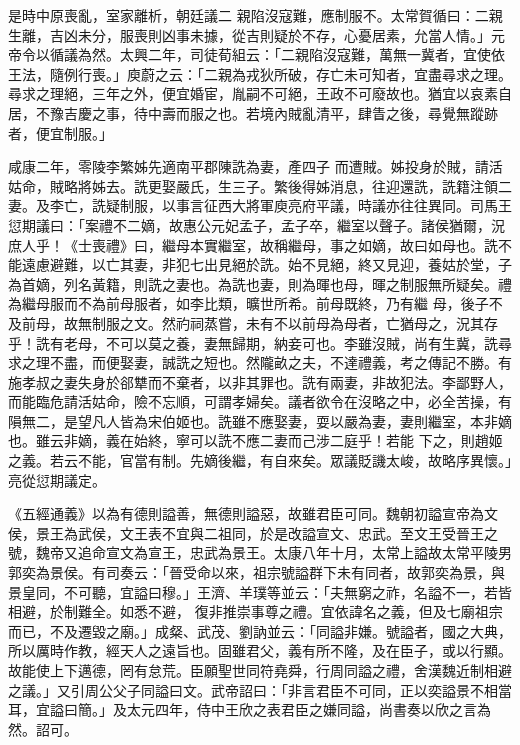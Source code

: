\begin{pinyinscope}
 是時中原喪亂，室家離析，朝廷議二
 親陷沒寇難，應制服不。太常賀循曰：二親生離，吉凶未分，服喪則凶事未據，從吉則疑於不存，心憂居素，允當人情。」元帝令以循議為然。太興二年，司徒荀組云：「二親陷沒寇難，萬無一冀者，宜使依王法，隨例行喪。」庾蔚之云：「二親為戎狄所破，存亡未可知者，宜盡尋求之理。尋求之理絕，三年之外，便宜婚宦，胤嗣不可絕，王政不可廢故也。猶宜以哀素自居，不豫吉慶之事，待中壽而服之也。若境內賊亂清平，肆眚之後，尋覺無蹤跡者，便宜制服。」



 咸康二年，零陵李繁姊先適南平郡陳詵為妻，產四子
 而遭賊。姊投身於賊，請活姑命，賊略將姊去。詵更娶嚴氏，生三子。繁後得姊消息，往迎還詵，詵籍注領二妻。及李亡，詵疑制服，以事言征西大將軍庾亮府平議，時議亦往往異同。司馬王愆期議曰：「案禮不二嫡，故惠公元妃孟子，孟子卒，繼室以聲子。諸侯猶爾，況庶人乎！《士喪禮》曰，繼母本實繼室，故稱繼母，事之如嫡，故曰如母也。詵不能遠慮避難，以亡其妻，非犯七出見絕於詵。始不見絕，終又見迎，養姑於堂，子為首嫡，列名黃籍，則詵之妻也。為詵也妻，則為暉也母，暉之制服無所疑矣。禮為繼母服而不為前母服者，如李比類，曠世所希。前母既終，乃有繼
 母，後子不及前母，故無制服之文。然礿祠蒸嘗，未有不以前母為母者，亡猶母之，況其存乎！詵有老母，不可以莫之養，妻無歸期，納妾可也。李雖沒賊，尚有生冀，詵尋求之理不盡，而便娶妻，誠詵之短也。然隴畝之夫，不達禮義，考之傳記不勝。有施孝叔之妻失身於郤犨而不棄者，以非其罪也。詵有兩妻，非故犯法。李鄙野人，而能臨危請活姑命，險不忘順，可謂孝婦矣。議者欲令在沒略之中，必全苦操，有隕無二，是望凡人皆為宋伯姬也。詵雖不應娶妻，耍以嚴為妻，妻則繼室，本非嫡也。雖云非嫡，義在始終，寧可以詵不應二妻而己涉二庭乎！若能
 下之，則趙姬之義。若云不能，官當有制。先嫡後繼，有自來矣。眾議貶譏太峻，故略序異懷。」亮從愆期議定。



 《五經通義》以為有德則謚善，無德則謚惡，故雖君臣可同。魏朝初謚宣帝為文侯，景王為武侯，文王表不宜與二祖同，於是改謚宣文、忠武。至文王受晉王之號，魏帝又追命宣文為宣王，忠武為景王。太康八年十月，太常上謚故太常平陵男郭奕為景侯。有司奏云：「晉受命以來，祖宗號謚群下未有同者，故郭奕為景，與景皇同，不可聽，宜謚曰穆。」王濟、羊璞等並云：「夫無窮之祚，名謚不一，若皆相避，於制難全。如悉不避，
 復非推崇事尊之禮。宜依諱名之義，但及七廟祖宗而已，不及遷毀之廟。」成粲、武茂、劉訥並云：「同謚非嫌。號謚者，國之大典，所以厲時作教，經天人之遠旨也。固雖君父，義有所不隆，及在臣子，或以行顯。故能使上下邁德，罔有怠荒。臣願聖世同符堯舜，行周同謚之禮，舍漢魏近制相避之議。」又引周公父子同謚曰文。武帝詔曰：「非言君臣不可同，正以奕謚景不相當耳，宜謚曰簡。」及太元四年，侍中王欣之表君臣之嫌同謚，尚書奏以欣之言為然。詔可。




\end{pinyinscope}
